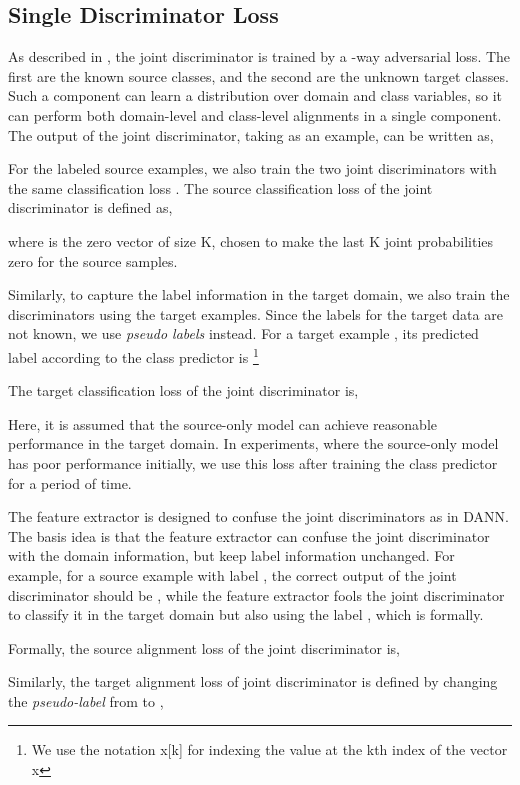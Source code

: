 \documentclass{ecai}
\begin{document}
\subsection{Single Discriminator Loss}
As described in \cite{b17}, the joint discriminator is trained by a -way adversarial loss. The first  are the known source classes, and the second  are the unknown target classes. Such a component can learn a distribution over domain and class variables, so it can perform both domain-level and class-level alignments in a single component. The output of the joint discriminator, taking  as an example, can be written as,


For the labeled source examples, we also train the two joint discriminators with the same classification loss . The source classification loss of the joint discriminator is defined as,

where  is the zero vector of size K, chosen to make the last K joint probabilities zero for the source samples.

Similarly, to capture the label information in the target domain, we also train the discriminators using the target examples. Since the labels for the target data are not known, we use {\emph{pseudo labels}} instead. For a target example , its predicted label according to the class predictor is \footnote {We use the notation x[k] for indexing the value at the kth index of the vector x}

The  target classification loss of the joint discriminator is,

Here, it is assumed that the source-only model can achieve reasonable performance in the target domain. In experiments, where the source-only model has poor performance initially, we use this loss after training the class predictor for a period of time.

The feature extractor  is designed to confuse the joint discriminators as in DANN\cite{b18}. The basis idea is that the feature extractor can confuse the joint discriminator with the domain information, but keep label information unchanged. For example, for a source example  with label , the correct output of the joint discriminator should be , while the feature extractor fools the joint discriminator to classify it in the target domain but also using the label , which is  formally.

Formally, the source alignment loss  of the joint discriminator is,


Similarly, the target alignment loss of joint discriminator is defined by changing the {\emph{pseudo-label}} from  to ,
\end{document}
